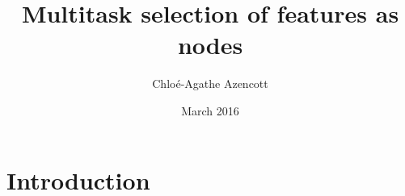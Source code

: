 \documentclass[12pt,a4paper]{article}
\title{Multitask selection of features as nodes}
\author{Chloé-Agathe Azencott}
\date{March 2016}
\begin{document}
\maketitle


\section{Introduction}



\end{document}
